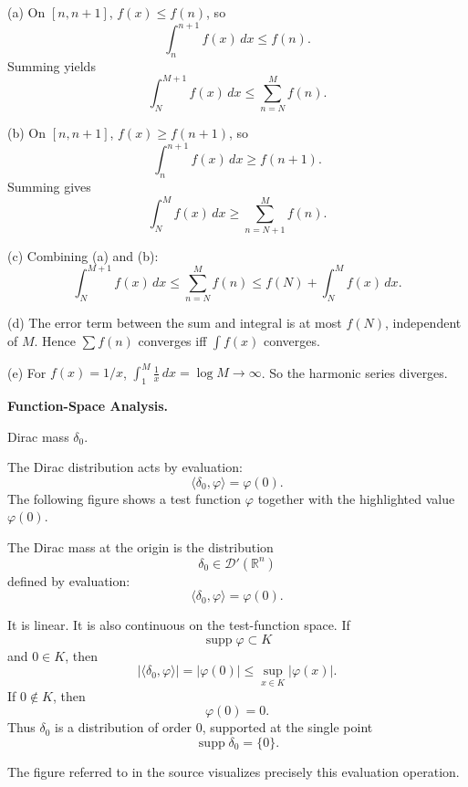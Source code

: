 \begin{solution}
(a) On $[n,n+1]$, $f(x)\leq f(n)$, so
	\[
	\int_n^{n+1} f(x)\,dx \leq f(n).
	\]
	Summing yields
	\[
	\int_N^{M+1} f(x)\,dx \leq \sum_{n=N}^M f(n).
	\]

	(b) On $[n,n+1]$, $f(x)\geq f(n+1)$, so
	\[
	\int_n^{n+1} f(x)\,dx \geq f(n+1).
	\]
	Summing gives
	\[
	\int_N^M f(x)\,dx \geq \sum_{n=N+1}^M f(n).
	\]

	(c) Combining (a) and (b):
	\[
	\int_N^{M+1} f(x)\,dx \leq \sum_{n=N}^M f(n) \leq f(N)+\int_N^M f(x)\,dx.
	\]

	(d) The error term between the sum and integral is at most $f(N)$, independent of $M$.
	Hence $\sum f(n)$ converges iff $\int f(x)$ converges.

	(e) For $f(x)=1/x$, $\int_1^M \frac{1}{x}\,dx=\log M\to\infty$.
	So the harmonic series diverges.
\end{solution}

\begin{problem}[CP-II-0188]
\label{prob:cp-ii-0188}
\textbf{Function-Space Analysis.}

\hspace*{1.5em}Dirac mass $\delta_0$.

The Dirac distribution acts by evaluation:
\[
\langle\delta_0,\varphi\rangle = \varphi(0).
\]
The following figure shows a test function $\varphi$ together with the
highlighted value $\varphi(0)$.
\end{problem}

\begin{solution}
The Dirac mass at the origin is the distribution
\[
\delta_0\in\mathcal D'(\mathbb R^n)
\]
defined by evaluation:
\[
\boxed{
\langle\delta_0,\varphi\rangle
=
\varphi(0).
}
\]

It is linear. It is also continuous on the test-function space. If
\[
\operatorname{supp}\varphi\subset K
\]
and \(0\in K\), then
\[
|\langle\delta_0,\varphi\rangle|
=
|\varphi(0)|
\le
\sup_{x\in K}|\varphi(x)|.
\]
If \(0\notin K\), then
\[
\varphi(0)=0.
\]
Thus \(\delta_0\) is a distribution of order \(0\), supported at the single point
\[
\boxed{\operatorname{supp}\delta_0=\{0\}.}
\]

The figure referred to in the source visualizes precisely this evaluation operation.
\end{solution}



